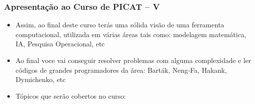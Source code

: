 \begin{frame}[fragile]
  \frametitle{Apresentação ao Curso de PICAT -- V}
  \begin{itemize}

						
    \item Assim, ao final deste curso terás uma sólida visão  de uma ferramenta
    computacional, utilizada em várias áreas tais como: modelagem matemática, IA,
    Pesquisa Operacional, etc

    \pause
    \item Ao final voce vai conseguir resolver problemas com alguma complexidade e ler
    códigos de grandes programadores da área: Barták, Neng-Fa, Hakank, Dymichenko, etc    
    
    \pause
    \item Tópicos  que serão cobertos no curso:
  \end{itemize}

\end{frame}
